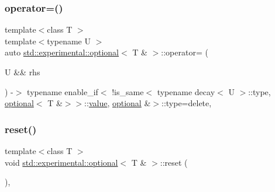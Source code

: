 \subsubsection{\texorpdfstring{operator=()}{operator=()}\hspace{0.1cm}{\footnotesize\ttfamily [3/3]}}
{\footnotesize\ttfamily template$<$class T $>$ \\
template$<$typename U $>$ \\
auto \hyperlink{classstd_1_1experimental_1_1optional}{std\+::experimental\+::optional}$<$ T \& $>$\+::operator= (\begin{DoxyParamCaption}\item[{U \&\&}]{rhs }\end{DoxyParamCaption}) -\/$>$  typename enable\+\_\+if$<$ !is\+\_\+same$<$ typename decay$<$ U $>$\+::type, \hyperlink{classstd_1_1experimental_1_1optional}{optional}$<$ T \&$>$$>$\+::\hyperlink{classstd_1_1experimental_1_1optional_ad1277f09c288255dfe102b72e7107be6}{value}, \hyperlink{classstd_1_1experimental_1_1optional}{optional} \&$>$\+::type=delete\hspace{0.3cm}{\ttfamily [delete]}, {\ttfamily [noexcept]}}

\mbox{\label{classstd_1_1experimental_1_1optional_3_01_t_01_6_01_4_a88cda3166b485696833779d31342719c}} 
\subsubsection{\texorpdfstring{reset()}{reset()}}
{\footnotesize\ttfamily template$<$class T $>$ \\
void \hyperlink{classstd_1_1experimental_1_1optional}{std\+::experimental\+::optional}$<$ T \& $>$\+::reset (\begin{DoxyParamCaption}{ }\end{DoxyParamCaption})\hspace{0.3cm}{\ttfamily [inline]}, {\ttfamily [noexcept]}}

\mbox{\label{classstd_1_1experimental_1_1optional_3_01_t_01_6_01_4_aa17c4d91763ef7f26fd8a3a546642f08}} 

